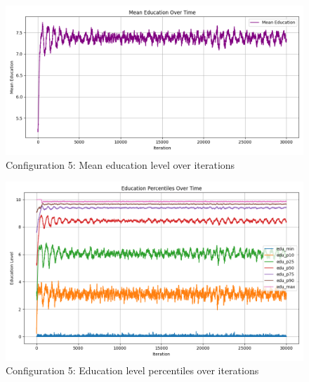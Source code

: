 \documentclass[english]{projectreport}
\begin{document}
    \begin{figure}[H]
        \centering
        \includegraphics[width=0.8\linewidth]{metrics_config5/metrics_config5_mean_education.png}
        \caption{Configuration 5: Mean education level over iterations}
        \label{fig:c0-mean_education}
    \end{figure}

    \begin{figure}[H]
        \centering
        \includegraphics[width=0.8\linewidth]{metrics_config5/metrics_config5_education_perc_time.png}
        \caption{Configuration 5: Education level percentiles over iterations}
        \label{fig:c0-education_perc_time}
    \end{figure}
\end{document}
